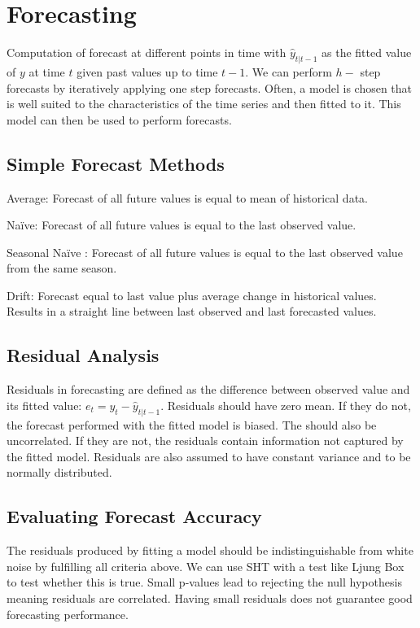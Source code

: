 \section{Forecasting}
Computation of forecast at different points in time with $ \hat{y}_{t|t-1} $ as the fitted value of $ y $ at time $ t $ given past values up to time $ t - 1 $.
We can perform $ h-$ step forecasts by iteratively applying one step forecasts.
Often, a model is chosen that is well suited to the characteristics of the time series and then fitted to it. This model can then be used to perform forecasts.

\subsection{Simple Forecast Methods}
Average: Forecast of all future values is equal to mean of historical data.

Naïve: Forecast of all future values is equal to the last observed value.

Seasonal Naïve : Forecast of all future values is equal to the last observed value from the same season.

Drift: Forecast equal to last value plus average change in historical values. Results in a straight line between last observed and last forecasted values.

\subsection{Residual Analysis}
Residuals in forecasting are defined as the difference between observed value and its fitted value: $ e_t = y_t - \hat{y}_{t|t-1} $.
Residuals should have zero mean. If they do not, the forecast performed with the fitted model is biased. The should also be uncorrelated.
If they are not, the residuals contain information not captured by the fitted model. Residuals are also assumed to have constant variance and to be normally distributed.

\subsection{Evaluating Forecast Accuracy}
The residuals produced by fitting a model should be indistinguishable from white noise by fulfilling all criteria above.
We can use SHT with a test like Ljung Box to test whether this is true.
Small p-values lead to rejecting the null hypothesis meaning residuals are correlated.
Having small residuals does not guarantee good forecasting performance.

